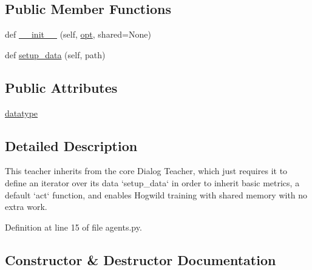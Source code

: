 \subsection*{Public Member Functions}
\begin{DoxyCompactItemize}
\item 
def \hyperlink{classparlai_1_1tasks_1_1ubuntu_1_1agents_1_1UbuntuTeacher_aa5a556a3369c3b20101179c6e3f63c2a}{\+\_\+\+\_\+init\+\_\+\+\_\+} (self, \hyperlink{classparlai_1_1core_1_1agents_1_1Teacher_a3ce6243860ce978a897922863ed32fa4}{opt}, shared=None)
\item 
def \hyperlink{classparlai_1_1tasks_1_1ubuntu_1_1agents_1_1UbuntuTeacher_ac8386ce4d46f4d3e8b296ac291ff4997}{setup\+\_\+data} (self, path)
\end{DoxyCompactItemize}
\subsection*{Public Attributes}
\begin{DoxyCompactItemize}
\item 
\hyperlink{classparlai_1_1tasks_1_1ubuntu_1_1agents_1_1UbuntuTeacher_ae664115e7a564e2a816adc8ecc6ea831}{datatype}
\end{DoxyCompactItemize}


\subsection{Detailed Description}
\begin{DoxyVerb}This teacher inherits from the core Dialog Teacher, which just requires it to define
an iterator over its data `setup_data` in order to inherit basic metrics, a default
`act` function, and enables Hogwild training with shared memory with no extra work.
\end{DoxyVerb}
 

Definition at line 15 of file agents.\+py.



\subsection{Constructor \& Destructor Documentation}
\mbox{\label{classparlai_1_1tasks_1_1ubuntu_1_1agents_1_1UbuntuTeacher_aa5a556a3369c3b20101179c6e3f63c2a}} 
